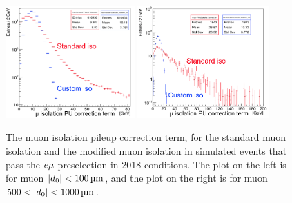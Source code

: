 \begin{figure}
\centering
\includegraphics[width=0.44\textwidth]{figures/selection/CustomVsStandardMuIsoPUcorrection_2018emuTTbar_PCR.png}
\includegraphics[width=0.45\textwidth]{figures/selection/CustomVsStandardMuIsoPUcorrection_2018emuTTbar_500To1000um.png}
\caption{The muon isolation pileup correction term, for the standard muon isolation and the modified muon isolation in simulated \ttbar events that pass the $e{\mu}$ preselection in 2018 conditions. The plot on the left is for muon $\ad<\SI{100}{\um}$, and the plot on the right is for muon $500<\ad<\SI{1000}{\um}$.}
\label{iso_pu_term_comparison}
\end{figure}

